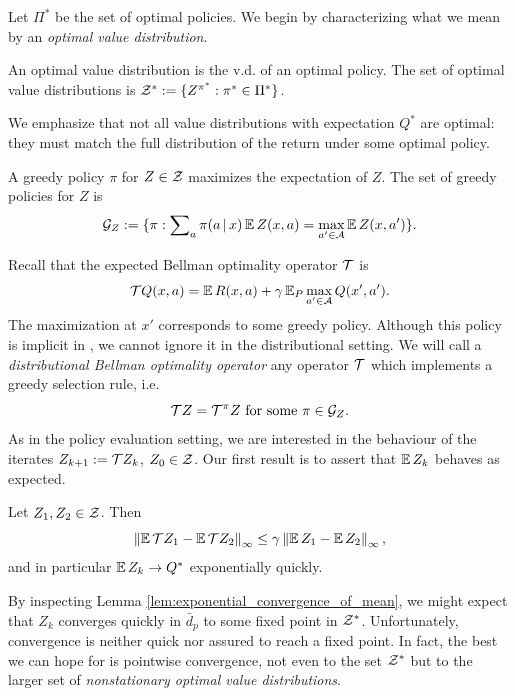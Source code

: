 \documentclass{article}
\def \cTpi {\cT^\pi}
\def \dip {\bar d_p}
\begin{document}
Let $\Pi^*$ be the set of optimal policies. We begin by characterizing what we mean by an \emph{optimal value distribution}.
\begin{defn}
An optimal value distribution is the v.d. of an optimal policy. The set of optimal value distributions is $\mathcal{Z}^* := \{ Z^{\pi^*} : \pi^* \in \Pi^* \}$.
\end{defn}
%
%
We emphasize that not all value distributions with expectation $Q^*$ are optimal: they must match the full distribution of the return under some optimal policy.
\begin{defn}
A greedy policy $\pi$ for $Z \in \mathcal{Z}$ maximizes the expectation of $Z$. The set of greedy policies for $Z$ is
\begin{equation*}
\cG_Z := \{ \pi : \sum\nolimits_a \pi(a \cbar x) \expect Z(x, a) = \max_{a' \in \cA} \expect Z(x, a') \}.
\end{equation*}
\end{defn}
Recall that the expected Bellman optimality operator $\mathcal{T}$ is
\begin{equation}
\cT Q(x,a) = \expect R (x,a) + \gamma \expects_P \max_{a' \in \cA} Q(x', a') . \label{eqn:bellman_optimality_operator}
\end{equation}
The maximization at $x'$ corresponds to some greedy policy. Although this policy is implicit in , we cannot ignore it in the distributional setting.
We will call a \emph{distributional Bellman optimality operator} any operator $\mathcal{T}$ which implements a greedy selection rule, i.e.
\begin{equation*}
\cT Z = \cTpi Z\text{ for some } \pi \in \cG_Z .
\end{equation*}
As in the policy evaluation setting, we are interested in the behaviour of the iterates $Z_{k+1} := \mathcal{T} Z_k$, $Z_0 \in \mathcal{Z}$. Our first result is to assert that $\expect Z_k$ behaves as expected.
\begin{lem}\label{lem:exponential_convergence_of_mean}
Let $Z_1, Z_2 \in \mathcal{Z}$. Then
\begin{equation*}
\infnorm{\expect \cT Z_1 - \expect \cT Z_2} \le \gamma \infnorm{\expect Z_1 - \expect Z_2},
\end{equation*}
and in particular $\expect Z_k \to Q^*$ exponentially quickly.
\end{lem}
By inspecting Lemma \ref{lem:exponential_convergence_of_mean}, we might expect that $Z_k$ converges quickly in $\dip$ to some fixed point in $\mathcal{Z}^*$. Unfortunately, convergence is neither quick nor assured to reach a fixed point. In fact, the best we can hope for is pointwise convergence, not even to the set $\mathcal{Z}^*$ but to the larger set of \emph{nonstationary optimal value distributions}.
\end{document}

